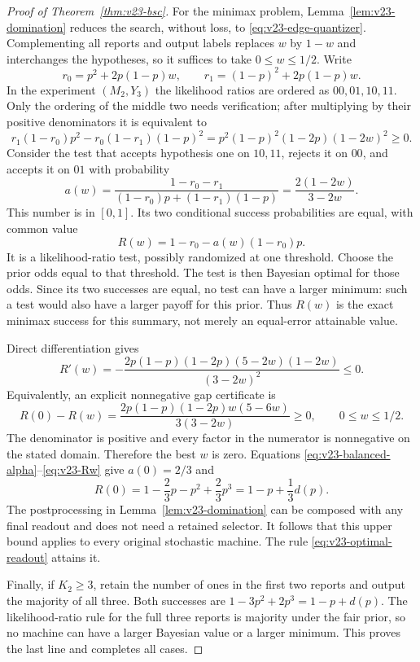 \begin{proof}[Proof of Theorem~\ref{thm:v23-bsc}]
For the minimax problem, Lemma~\ref{lem:v23-domination} reduces the
search, without loss, to \eqref{eq:v23-edge-quantizer}. Complementing
all reports and output labels replaces $w$ by $1-w$ and interchanges
the hypotheses, so it suffices to take $0\le w\le1/2$. Write
\[
 r_0=p^2+2p(1-p)w,\qquad
 r_1=(1-p)^2+2p(1-p)w.
\]
In the experiment $(M_2,Y_3)$ the likelihood ratios are ordered as
$00,01,10,11$. Only the ordering of the middle two needs verification;
after multiplying by their positive denominators it is equivalent to
\[
 r_1(1-r_0)p^2-r_0(1-r_1)(1-p)^2
       =p^2(1-p)^2(1-2p)(1-2w)^2\ge0.
\]
Consider the test that accepts hypothesis one on $10,11$, rejects it
on $00$, and accepts it on $01$ with probability
\begin{equation}\label{eq:v23-balanced-alpha}
 a(w)=\frac{1-r_0-r_1}
               {(1-r_0)p+(1-r_1)(1-p)}
     =\frac{2(1-2w)}{3-2w}.
\end{equation}
This number is in $[0,1]$. Its two conditional success probabilities
are equal, with common value
\begin{equation}\label{eq:v23-Rw}
 R(w)=1-r_0-a(w)(1-r_0)p.
\end{equation}
It is a likelihood-ratio test, possibly randomized at one threshold.
Choose the prior odds equal to that threshold. The test is then
Bayesian optimal for those odds. Since its two successes are equal,
no test can have a larger minimum: such a test would also have a
larger payoff for this prior. Thus $R(w)$ is the exact minimax success
for this summary, not merely an equal-error attainable value.

Direct differentiation gives
\begin{equation}\label{eq:v23-R-derivative}
 R'(w)=-\frac{2p(1-p)(1-2p)(5-2w)(1-2w)}{(3-2w)^2}\le0.
\end{equation}
Equivalently, an explicit nonnegative gap certificate is
\begin{equation}\label{eq:v23-gap-certificate}
 R(0)-R(w)=
 \frac{2p(1-p)(1-2p)w(5-6w)}{3(3-2w)}\ge0,
                  \qquad 0\le w\le1/2.
\end{equation}
The denominator is positive and every factor in the numerator is
nonnegative on the stated domain. Therefore the best $w$ is zero. Equations
\eqref{eq:v23-balanced-alpha}--\eqref{eq:v23-Rw} give
$a(0)=2/3$ and
\[
 R(0)=1-\frac23p-p^2+\frac23p^3
                         =1-p+\frac13d(p).
\]
The postprocessing in Lemma~\ref{lem:v23-domination} can be composed
with any final readout and does not need a retained selector. It follows
that this upper bound applies to every original stochastic machine.
The rule \eqref{eq:v23-optimal-readout} attains it.

Finally, if $K_2\ge3$, retain the number of ones in the first two
reports and output the majority of all three. Both successes are
$1-3p^2+2p^3=1-p+d(p)$. The likelihood-ratio rule for the full three
reports is majority under the fair prior, so no machine can have a
larger Bayesian value or a larger minimum. This proves the last line
and completes all cases.
\end{proof}


